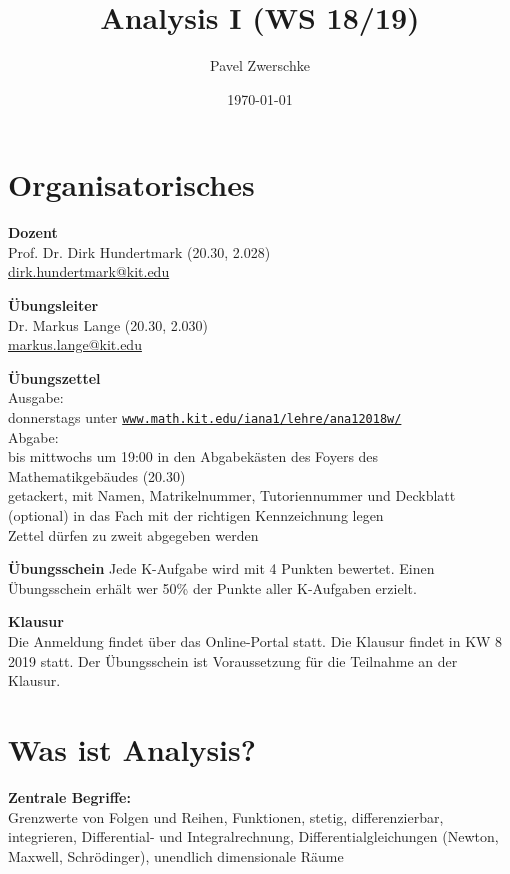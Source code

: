 \documentclass[12pt,a4paper,titlepage]{article} %
\begin{document}
\title{Analysis I (WS 18/19)}
\date{\today}
\author{Pavel Zwerschke}
\maketitle

\tableofcontents
\newpage

\setcounter{section}{-1}
\section{Organisatorisches}
\textbf{Dozent}\\
Prof. Dr. Dirk Hundertmark (20.30, 2.028)\\
\href{mailto:dirk.hundertmark@kit.edu}{dirk.hundertmark@kit.edu}

\textbf{Übungsleiter}\\
Dr. Markus Lange (20.30, 2.030)\\
\href{mailto:markus.lange@kit.edu}{markus.lange@kit.edu}

\textbf{Übungszettel}\\
Ausgabe:\\
donnerstags unter \href{http://www.math.kit.edu/iana1/lehre/ana12018w/}{\texttt{www.math.kit.edu/iana1/lehre/ana12018w/}}\\
Abgabe:\\
bis mittwochs um 19:00 in den Abgabekästen des Foyers des Mathematikgebäudes (20.30)\\
getackert, mit Namen, Matrikelnummer, Tutoriennummer und Deckblatt (optional) in das Fach mit der richtigen Kennzeichnung legen\\
Zettel dürfen zu zweit abgegeben werden

\textbf{Übungsschein}
Jede K-Aufgabe wird mit 4 Punkten bewertet. Einen Übungsschein erhält wer 50\% der Punkte aller K-Aufgaben erzielt.

\textbf{Klausur}\\
Die Anmeldung findet über das Online-Portal statt. Die Klausur findet in KW 8 2019 statt. Der Übungsschein ist Voraussetzung für die Teilnahme an der Klausur.

\newpage

\section{Was ist Analysis?}
\textbf{Zentrale Begriffe:}\\
Grenzwerte von Folgen und Reihen, Funktionen, stetig, differenzierbar, integrieren, Differential- und Integralrechnung, Differentialgleichungen (Newton, Maxwell, Schrödinger), unendlich dimensionale Räume
\end{document}
